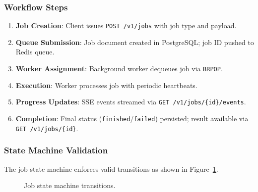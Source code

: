 \subsubsection{Workflow Steps}

\begin{enumerate}
    \item \textbf{Job Creation}: Client issues \texttt{POST /v1/jobs} with job type and payload.
    
    \item \textbf{Queue Submission}: Job document created in PostgreSQL; job ID pushed to Redis queue.
    
    \item \textbf{Worker Assignment}: Background worker dequeues job via \texttt{BRPOP}.
    
    \item \textbf{Execution}: Worker processes job with periodic heartbeats.
    
    \item \textbf{Progress Updates}: SSE events streamed via \texttt{GET /v1/jobs/\{id\}/events}.
    
    \item \textbf{Completion}: Final status (\texttt{finished}/\texttt{failed}) persisted; result available via \texttt{GET /v1/jobs/\{id\}}.
\end{enumerate}

\subsubsection{State Machine Validation}

The job state machine enforces valid transitions as shown in Figure~\ref{fig:job-state-machine}.

\begin{figure}[ht]
\centering
{}
\caption{Job state machine transitions.}
\label{fig:job-state-machine}
\end{figure}

